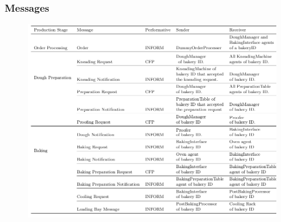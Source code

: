 \documentclass{beamer}
\begin{document}
		\begin{frame}
			\frametitle{Messages}
			
			\begin{figure}\vspace{-1cm}
				\includegraphics[scale=0.29]{images/messages.png}
			\end{figure}
		\end{frame}
		
		
\end{document}
